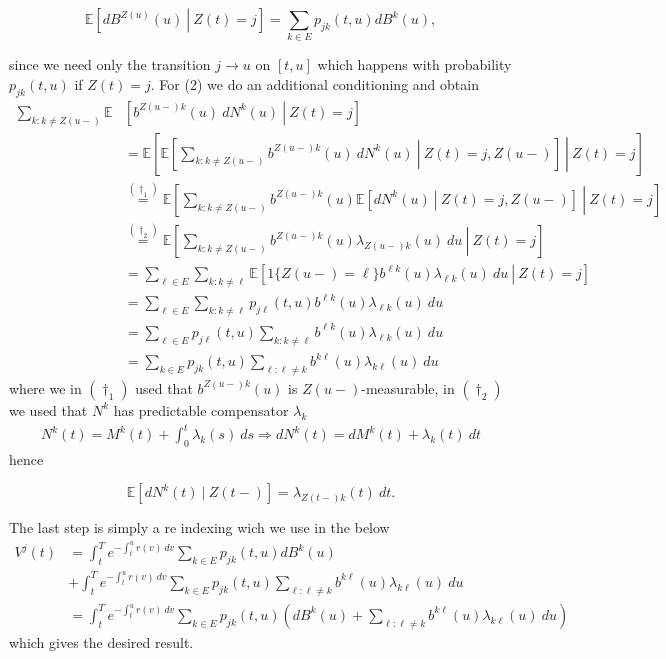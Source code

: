 \documentclass[a4paper,10pt,openany]{book}
\begin{document}
\[
\mathbb E\left[\left. dB^{Z(u)}(u) \ \right\vert\ Z(t)= j\right]=\sum_{k\in E}p_{jk}(t,u)d B^k(u),
\]

since we need only the transition \(j\to u\) on \([t,u]\) which happens with probability \(p_{jk}(t,u)\) if \(Z(t)=j\). For (2) we do an additional conditioning and obtain
\begin{align*}
\sum_{k:k\ne Z(u-)}\mathbb E&\left[\left. b^{Z(u-)k}(u)\ dN^k(u) \ \right\vert\ Z(t)= j\right]\\
&=\mathbb E\left[\left.\mathbb E\left[\left.\sum_{k:k\ne Z(u-)} b^{Z(u-)k}(u)\ dN^k(u) \ \right\vert\ Z(t)= j,Z(u-)\right]\ \right\vert\ Z(t)= j\right]\\
&\stackrel{(\dagger_1)}{=}\mathbb E\left[\left.\sum_{k:k\ne Z(u-)} b^{Z(u-)k}(u)\mathbb E\left[\left. dN^k(u) \ \right\vert\ Z(t)= j,Z(u-)\right]\ \right\vert\ Z(t)= j\right]\\
&\stackrel{(\dagger_2)}{=}\mathbb E\left[\left.\sum_{k:k\ne Z(u-)} b^{Z(u-)k}(u)\lambda_{Z(u-)k}(u)\ du\ \right\vert\ Z(t)= j\right]\\
&=\sum_{\ell\in E}\sum_{k:k\ne \ell}\mathbb E\left[\left.1\{Z(u-)=\ell\} b^{\ell k}(u)\lambda_{\ell k}(u)\ du\ \right\vert\ Z(t)= j\right]\\
&=\sum_{\ell\in E}\sum_{k:k\ne \ell} p_{j\ell}(t,u) b^{\ell k}(u)\lambda_{\ell k}(u)\ du\\
&=\sum_{\ell\in E}p_{j\ell}(t,u)\sum_{k:k\ne \ell}  b^{\ell k}(u)\lambda_{\ell k}(u)\ du\\
&=\sum_{k\in E}p_{jk}(t,u)\sum_{\ell :\ell \ne k}  b^{k\ell }(u)\lambda_{k\ell }(u)\ du
\end{align*}
where we in \((\dagger_1)\) used that \(b^{Z(u-)k}(u)\) is \(Z(u-)\)-measurable, in \((\dagger_2)\) we used that \(N^k\) has predictable compensator \(\lambda_k\)
\begin{align*}
N^k(t)=M^k(t)+\int_0^t\lambda_k(s)\ ds\Rightarrow dN^k(t)=dM^k(t)+\lambda_k(t)\ dt
\end{align*}
hence

\[
\mathbb E[dN^k(t) \ \vert\ Z(t-)]=\lambda_{Z(t-)k}(t)\ dt.
\]

The last step is simply a re indexing wich we use in the below
\begin{align*}
V^j(t)&=\int_t^Te^{-\int_t^ur(v)\ dv}\sum_{k\in E}p_{jk}(t,u)d B^k(u)\\
&+\int_t^Te^{-\int_t^ur(v)\ dv}\sum_{k\in E}p_{jk}(t,u)\sum_{\ell :\ell \ne k}  b^{k\ell }(u)\lambda_{k\ell }(u)\ du\\
&=\int_t^Te^{-\int_t^ur(v)\ dv}\sum_{k\in E}p_{jk}(t,u)\left(d B^k(u)+\sum_{\ell :\ell \ne k}  b^{k\ell }(u)\lambda_{k\ell }(u)\ du\right)
\end{align*}
which gives the desired result.
\end{document}
